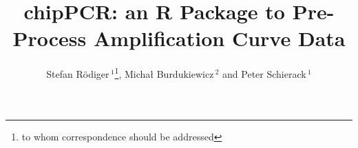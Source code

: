 \documentclass{bioinfo}
\begin{document}

\title[chipPCR]{chipPCR: an R Package to Pre-Process Amplification Curve Data}
\author[R\"odiger \textit{et~al.}]{Stefan R\"odiger\,$^{1}$\footnote{to whom correspondence should be addressed}, Micha\l{} Burdukiewicz\,$^{2}$ and Peter Schierack\,$^1$}
\address{$^{1}$Faculty of Natural Sciences, Brandenburg University of Technology 
Cottbus--Senftenberg, Senftenberg, Germany\\
$^{2}$Department of Genomics, Faculty of Biotechnology, University of 
Wroc\l{}aw, Wroc\l{}aw, Poland}



\maketitle
\end{document}
